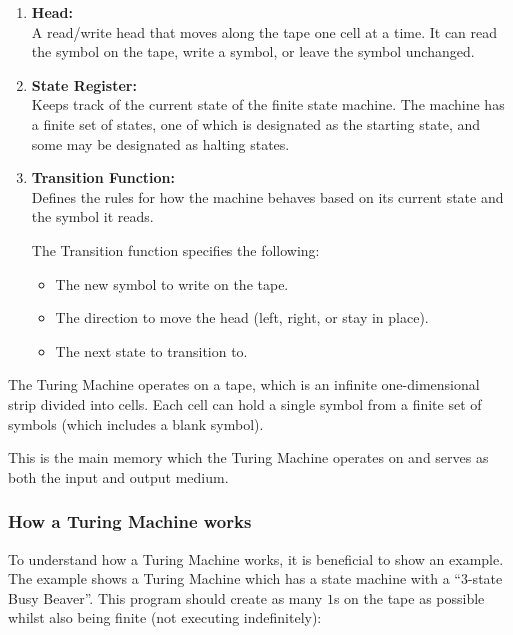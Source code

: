 \begin{enumerate}
    \item \textbf{Head:} \\
    A read/write head that moves along the tape one cell at a time.
    It can read the symbol on the tape, write a symbol, or leave the symbol unchanged.

    \item \textbf{State Register:} \\
    Keeps track of the current state of the finite state machine.
    The machine has a finite set of states, one of which is designated as the starting state, and some may be designated as halting states.

    \item \textbf{Transition Function:} \\
    Defines the rules for how the machine behaves based on its current state and the symbol it reads.

    The Transition function specifies the following:
    \begin{itemize}
        \item The new symbol to write on the tape.
        \item The direction to move the head (left, right, or stay in place).
        \item The next state to transition to.
    \end{itemize}
\end{enumerate}

The Turing Machine operates on a tape, which is an infinite one-dimensional strip divided into cells. 
Each cell can hold a single symbol from a finite set of symbols (which includes a blank symbol).

This is the main memory which the Turing Machine operates on and serves as both the input and output medium.

\newpage
\subsubsection{How a Turing Machine works}

To understand how a Turing Machine works, it is beneficial to show an example. The example shows a Turing Machine which has a state machine
with a ``3-state Busy Beaver''. This program should create as many $1$s on the tape as possible whilst also being finite (not executing indefinitely):

